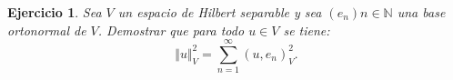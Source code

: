 \documentclass[11pt]{report}
\newtheorem{ex}{Ejercicio}
\newenvironment{solution}{\begin{proof}[Solución]}{\end{proof}}
\newcommand{\inner}[2]{( #1, #2 )_V}
\newcommand{\norma}[1]{\Vert #1 \Vert_V}
\begin{document}


%







\begin{ex}
Sea $V$ un espacio de Hilbert separable y sea $(e_n){n \in \mathbb{N}}$ una base ortonormal de $V$. Demostrar que para todo $u \in V$ se tiene:
\begin{equation*}
\norma{u}^2 = \sum_{n=1}^\infty \inner{u}{e_n}^2.
\end{equation*}
\end{ex}
\end{document}
